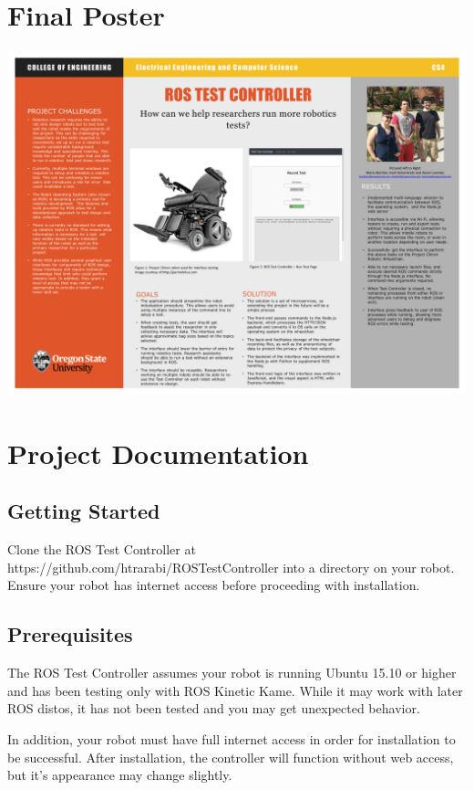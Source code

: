 \documentclass[onecolumn, draftclsnofoot,10pt, compsoc]{report}
\begin{document}
\chapter{Final Poster}
\minitoc
\includegraphics[width=\textwidth]{team04.png}

\chapter{Project Documentation}

\minitoc
\section{Getting Started}


Clone the ROS Test Controller at https://github.com/htrarabi/ROSTestController into a directory on your robot. Ensure your robot has internet access before proceeding with installation.

\section{Prerequisites}

The ROS Test Controller assumes your robot is running Ubuntu 15.10 or higher and has been testing only with ROS Kinetic Kame. While it may work with later ROS distos, it has not been tested and you may get unexpected behavior.

In addition, your robot must have full internet access in order for installation to be successful. After installation, the controller will function without web access, but it's appearance may change slightly.
\end{document}
